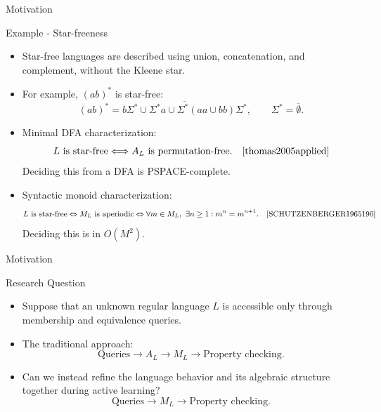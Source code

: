 \documentclass{beamer}
\begin{document}
\begin{frame}{Motivation}
    \begin{block}{Example - Star-freeness}
        \begin{itemize}
        \item Star-free languages are described using union,
        concatenation, and complement, without the Kleene star.
        \item For example, $(ab)^*$ is star-free:
        \[
        (ab)^*=
        \overline{
        b\Sigma^*\cup\Sigma^*a
        \cup\Sigma^*(aa\cup bb)\Sigma^*
        },
        \qquad \Sigma^*=\overline{\emptyset}.
        \]
        \item Minimal DFA characterization:
        \[
        L\text{ is star-free}
        \Longleftrightarrow A_L\text{ is permutation-free}.
        \quad \cite{thomas2005applied}
        \]
        Deciding this from a DFA is PSPACE-complete.

        \item Syntactic monoid characterization:
        \[ \small
        \begin{aligned}
        L \text{ is star-free}
        \Leftrightarrow M_L \text{ is aperiodic} 
        \Leftrightarrow
        \forall m\in M_L,\ \exists n\geq 1:
        m^n = m^{n+1}.
        \end{aligned}
        \quad \cite{SCHUTZENBERGER1965190}
        \]
        Deciding this is in $O(M^2)$.
    \end{itemize}
    \end{block}
\end{frame}

\begin{frame}{Motivation}
    \begin{block}{Research Question}
        \begin{itemize}
            \item Suppose that an unknown regular language $L$
            is accessible only through membership and equivalence queries.

            \item The traditional approach:
            \[
            \text{Queries}
            \longrightarrow A_L
            \longrightarrow M_L
            \longrightarrow \text{Property checking}.
            \]

            \item Can we instead refine the language behavior and its
            algebraic structure together during active learning?
            \[
            \text{Queries}
            \longrightarrow M_L
            \longrightarrow \text{Property checking}.
            \]
        \end{itemize}
    \end{block}
\end{frame}
\end{document}
